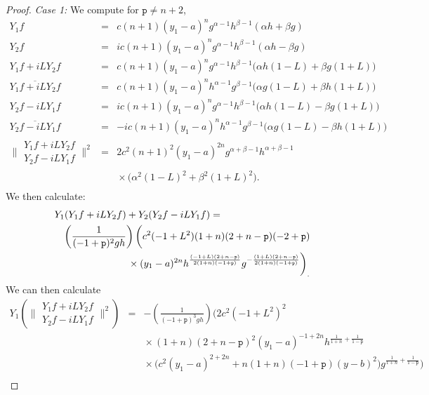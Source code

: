 \documentclass[12pt]{amsart}
\theoremstyle{plain}
\theoremstyle{definition}
\numberwithin{equation}{section}
\begin{document}
\begin{proof}
\emph{Case 1:} We compute for ${\texttt{p}} \neq n+2$, 
\begin{eqnarray*}
Y_1f & = & c(n+1)(y_1-a)^{n}g^{\alpha-1}h^{\beta-1}(\alpha h+\beta g)\\
Y_2f & = & ic(n+1)(y_1-a)^{n}g^{\alpha-1}h^{\beta-1}(\alpha h-\beta g)\\
Y_1f+iLY_2f & = & c(n+1)(y_1-a)^{n}g^{\alpha-1}h^{\beta-1}\big(\alpha h(1-L) +\beta g(1+L)\big)  \\
\overline{Y_1f+iLY_2f} & = & c(n+1)(y_1-a)^{n}h^{\alpha-1}g^{\beta-1}\big(\alpha g(1-L) +\beta h(1+L)\big)  \\
Y_2f-iLY_1f & = &  ic(n+1)(y_1-a)^{n}g^{\alpha-1}h^{\beta-1}\big(\alpha h(1-L) -\beta g(1+L)\big) \\
\overline{Y_2f-iLY_1f} & = &  -ic(n+1)(y_1-a)^{n}h^{\alpha-1}g^{\beta-1}\big(\alpha g(1-L) -\beta h(1+L)\big) \\
 \bigg\| \begin{array}{c}
 Y_1f+iLY_2f\\
 Y_2f-iLY_1f
\end{array} \bigg\|^{2}
& = & 2c^2(n+1)^2(y_1-a)^{2n}g^{\alpha+\beta-1}h^{\alpha+\beta-1}\\
&&\mbox{} \times\big(\alpha^2(1-L)^2+\beta^2(1+L)^2 \big). \\
\end{eqnarray*}
We then calculate:
\begin{eqnarray*}
\lefteqn{Y_1(Y_1f+iLY_2f)+Y_2(Y_2f-iLY_1f) =} & & \\
& & \left(\frac{1}{(-1+{\texttt{p}})^2gh}\right)\bigg(c^2 (-1 + L^2)(1 + n)(2 + n - {\texttt{p}}) (-2 + {\texttt{p}})\\
&&\mbox{} \times( y_1-a)^{2 n} h^{\frac{(-1 + L) (2 + n - {\texttt{p}})}{2 (1 + n) (-1 + {\texttt{p}})}} 
g^{-\frac{(1 + L) (2 + n - {\texttt{p}})}{2 (1 + n) (-1 + {\texttt{p}})}}\bigg)_.
\end{eqnarray*}
We can then calculate
\begin{eqnarray*}
Y_1\left( \bigg\| \begin{array}{c}
 Y_1f+iLY_2f\\
 Y_2f-iLY_1f
\end{array} \bigg\|^{2}\right)
& = &-\left(\frac{1}{(-1 + {\texttt{p}})^3 gh} \right)\bigg(2 c^2 (-1 + L^2)^2 \\
&&\mbox{}\times(1 + n) (2 + n - {\texttt{p}})^2 (y_1-a)^{-1 + 2 n} h^{\frac{1}{1 + n}+\frac{1}{1 - {\texttt{p}}}} \\
&&\mbox{}\times\big(c^2 (y_1-a)^{2 + 2 n} + n (1 + n) (-1 + {\texttt{p}}) (y-b)^2\big) g^{\frac{1}{1 + n} + \frac{1}{1 - {\texttt{p}}}} \bigg)\\

\end{eqnarray*}
\end{proof}
\end{document}
